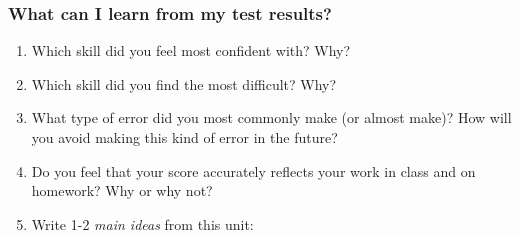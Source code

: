 \documentclass[12pt, oneside]{article}
\begin{document}
\subsubsection*{What can I learn from my test results?}

  \begin{enumerate}

    \item Which skill did you feel most confident with? Why?
    \item Which skill did you find the most difficult? Why?
    \item What type of error did you most commonly make (or almost make)? How will you avoid making this kind of error in the future?
    \item Do you feel that your score accurately reflects your work in class and on homework? Why or why not?
    \item Write 1-2 \emph{main ideas} from this unit:

  \end{enumerate}
\end{document}
